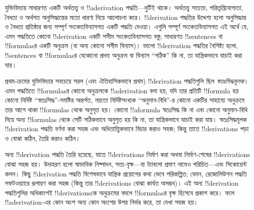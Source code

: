 \documentclass[../../../include/open-logic-section]{subfiles}
\begin{document}
      {}
      {}


যুক্তিবিদ্যায় সাধারণত একটি অর্থতত্ত্ব ও !!a{derivation}
পদ্ধতি—দুটিই থাকে। অর্থতত্ত্ব সত্যতা, পরিতৃপ্তিযোগ্যতা, বৈধতা ও
অর্থগত অনুসিদ্ধান্তের মতো ধারণা নিয়ে আলোচনা করে। !!{derivation}
পদ্ধতির উদ্দেশ্য হলো অনুসিদ্ধান্ত ও বৈধতা প্রতিষ্ঠার জন্য সম্পূর্ণ
সংকেতবিন্যাসগত একটি পদ্ধতি দেওয়া। এগুলি সম্পূর্ণ সংকেতবিন্যাসগত এই অর্থে
যে, এমন পদ্ধতিতে কোনো !!{derivation} একটি সসীম সংকেতবিন্যাসগত বস্তু;
সাধারণত !!{sentence}s বা !!{formula}sর একটি অনুক্রম (বা অন্য কোনো
সসীম বিন্যাস)। ভালো !!{derivation} পদ্ধতির বৈশিষ্ট্য হলো, !!{sentence}s
বা !!{formula}sর যেকোনো প্রদত্ত অনুক্রম বা বিন্যাস “সঠিক” কি না,
তা যান্ত্রিকভাবে যাচাই করা যায়।

প্রথম-ক্রমের যুক্তিবিদ্যার সবচেয়ে সরল (এবং ঐতিহাসিকভাবে প্রথম)
!!{derivation} পদ্ধতিগুলি ছিল \emph{স্বতঃসিদ্ধমূলক}। এমন পদ্ধতিতে
!!{formula}sর কোনো অনুক্রমকে !!a{derivation} বলা হয়, যদি তার
প্রতিটি !!{formula} হয় কোনো নির্দিষ্ট “স্বতঃসিদ্ধ”-সমষ্টির অন্তর্গত,
নয়তো নির্দিষ্টসংখ্যক “অনুমান-বিধি”-র কোনো একটির সাহায্যে অনুক্রমে তার
আগে থাকা !!{formula}s থেকে অনুসৃত হয়। কোনো !!a{formula} স্বতঃসিদ্ধ কি
না এবং কোনো অনুমান-বিধি দিয়ে অন্য !!{formula}s থেকে সেটি সঠিকভাবে
অনুসৃত হয় কি না, তা যান্ত্রিকভাবে যাচাই করা যায়। স্বতঃসিদ্ধমূলক
!!{derivation} পদ্ধতি বর্ণনা করা সহজ এবং অধিতাত্ত্বিকভাবে বিচার করাও
সহজ; কিন্তু তাতে !!{derivation}s পড়া ও বোঝা কঠিন, তৈরি করাও কঠিন।

অন্য !!{derivation} পদ্ধতি তৈরি হয়েছে, যাতে !!{derivation}s নির্মাণ
করা অথবা নির্মাণ-শেষের !!{derivation}s বোঝা সহজ হয়। উদাহরণ হলো স্বাভাবিক
নিষ্পাদন, সত্য-বৃক্ষ—যা ট্যাবলো প্রমাণ নামেও পরিচিত—এবং সিকোয়েন্ট কলন।
কিছু !!{derivation} পদ্ধতি বিশেষভাবে যান্ত্রিক প্রয়োগের কথা ভেবে
পরিকল্পিত; যেমন, রেজোলিউশন পদ্ধতি সফটওয়্যারে রূপায়ণ করা সহজ (কিন্তু তার
!!{derivation}s বোঝা কার্যত অসম্ভব)। এই অন্য !!{derivation} পদ্ধতিগুলির অধিকাংশই
!!{derivation}sকে অনুক্রমের বদলে !!{formula}sর বৃক্ষ হিসেবে প্রকাশ
করে। ফলে !!a{derivation}-এর কোন অংশ অন্য কোন অংশের উপর নির্ভর করে,
তা দেখা সহজ হয়।
\end{document}
